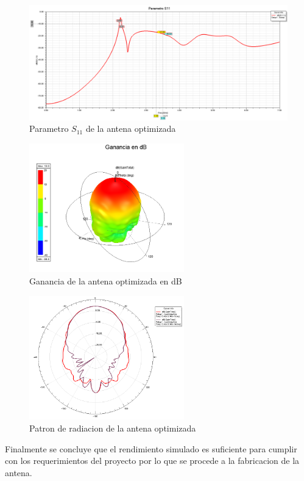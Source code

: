 \begin{itemize}
		\begin{figure}
			\centering
			\includegraphics[width=1\textwidth]{img/ejemplos/Figure_4}
			\caption{Parametro $S_{11}$ de la antena optimizada}
		\end{figure}
		\begin{figure}
			\centering
			\includegraphics[width=0.6\textwidth]{img/ejemplos/Figure_5}
			\caption{Ganancia de la antena optimizada en dB} 
		\end{figure}
		\begin{figure}
			\centering
			\includegraphics[width=0.6\textwidth]{img/ejemplos/Figure_6}
			\caption{Patron de radiacion de la antena optimizada}
		\end{figure}
		Finalmente se concluye que el rendimiento simulado es suficiente para cumplir con los requerimientos del proyecto por lo que se procede a la fabricacion de la antena.

\end{itemize}
